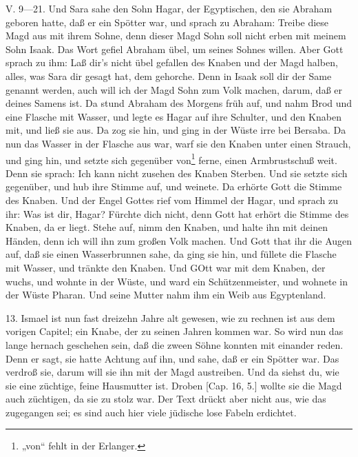 V. 9—21. Und Sara sahe den Sohn Hagar, der Egyptischen, den sie Abraham geboren hatte, daß er ein Spötter war, und sprach zu Abraham: Treibe diese Magd aus mit ihrem Sohne, denn dieser Magd Sohn soll nicht erben mit meinem Sohn Isaak. Das Wort gefiel Abraham übel, um seines Sohnes willen. Aber Gott sprach zu ihm: Laß dir’s nicht übel gefallen des Knaben und der Magd halben, alles, was Sara dir gesagt hat, dem gehorche. Denn in Isaak soll dir der Same genannt werden, auch will ich der Magd Sohn zum Volk machen, darum, daß er deines Samens ist. Da stund Abraham des Morgens früh auf, und nahm Brod und eine Flasche mit Wasser, und legte es Hagar auf ihre Schulter, und den Knaben mit, und ließ sie aus. Da zog sie hin, und ging in der Wüste irre bei Bersaba. Da nun das Wasser in der Flasche aus war, warf sie den Knaben unter einen Strauch, und ging hin, und setzte sich gegenüber von\footnote{„von“ fehlt in der Erlanger.} ferne, einen Armbrustschuß weit. Denn sie sprach: Ich kann nicht zusehen des Knaben Sterben. Und sie setzte sich gegenüber, und hub ihre Stimme auf, und weinete. Da erhörte Gott die Stimme des Knaben. Und der Engel Gottes rief vom Himmel der Hagar, und sprach zu ihr: Was ist dir, Hagar? Fürchte dich nicht, denn Gott hat erhört die Stimme des Knaben, da er liegt. Stehe auf, nimm den Knaben, und halte ihn mit deinen Händen, denn ich will ihn zum großen Volk machen. Und Gott that ihr die Augen auf, daß sie einen Wasserbrunnen sahe, da ging sie hin, und füllete die Flasche mit Wasser, und tränkte
den Knaben. Und GOtt war mit dem Knaben, der wuchs, und wohnte in der Wüste, und ward ein Schützenmeister, und wohnete in der Wüste Pharan. Und seine Mutter nahm ihm ein Weib aus Egyptenland.

13. Ismael ist nun fast dreizehn Jahre alt gewesen, wie zu rechnen ist aus dem vorigen Capitel; ein Knabe, der zu seinen Jahren kommen war. So wird nun das lange hernach geschehen sein, daß die zween Söhne konnten mit einander reden. Denn er sagt, sie hatte Achtung auf ihn, und sahe, daß er ein Spötter war. Das verdroß sie, darum will sie ihn mit der Magd austreiben. Und da siehst du, wie sie eine züchtige, feine Hausmutter ist. Droben [Cap. 16, 5.] wollte sie die Magd auch züchtigen, da sie zu stolz war. Der Text drückt aber nicht aus, wie das zugegangen sei; es sind auch hier viele jüdische lose Fabeln erdichtet.

